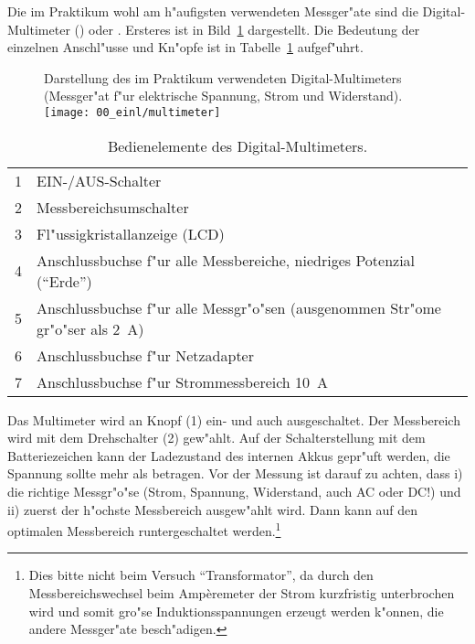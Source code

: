 Die im Praktikum wohl am h"aufigsten verwendeten Messger"ate sind
die Digital-Multimeter ()  oder
. Ersteres ist in
Bild~\ref{a:multimeter} dargestellt. Die Bedeutung der einzelnen
Anschl"usse und Kn"opfe ist in Tabelle~\ref{t:multimeter}
aufgef"uhrt.
%
{\samepage
\begin{figure}[t]
 \begin{captionbeside}{\label{a:multimeter}Darstellung des im Praktikum verwendeten
  Digital-Multimeters  (Messger"at f"ur elektrische Spannung,
  Strom und Widerstand).}
  \texttt{[image: 00\_einl/multimeter]}
 \end{captionbeside}
\end{figure}
%
\begin{table}[t]%
  \centering%
  \caption{\label{t:multimeter}Bedienelemente des Digital-Multimeters.}%
  \begin{tabular}{lp{10cm}}\toprule%
  1 & EIN-/AUS-Schalter  \\
  2 & Messbereichsumschalter  \\
  3 & Fl"ussigkristallanzeige (LCD)  \\
  4 & Anschlussbuchse f"ur alle Messbereiche, niedriges Potenzial ("`Erde"')\\
  5 & Anschlussbuchse f"ur alle Messgr"o"sen (ausgenommen Str"ome gr"o"ser als
  2~A)   \\
  6 & Anschlussbuchse f"ur Netzadapter   \\
  7 & Anschlussbuchse f"ur Strommessbereich 10~A  \\ \bottomrule
\end{tabular}
\end{table}
}
%
Das Multimeter wird an Knopf (1) ein- und auch ausgeschaltet. Der
Messbereich wird mit dem Drehschalter (2) gew"ahlt. Auf der
Schalterstellung mit dem Batteriezeichen kann der Ladezustand des
internen Akkus gepr"uft werden, die Spannung sollte mehr als
 betragen. Vor der Messung ist darauf zu achten,
dass i) die richtige Messgr"o"se (Strom, Spannung, Widerstand, auch
AC oder DC!) und ii) zuerst der h"ochste Messbereich ausgew"ahlt
wird. Dann kann auf den optimalen Messbereich runtergeschaltet
werden.\footnote{Dies bitte nicht beim Versuch "`Transformator"',
da durch den Messbereichswechsel beim Amp\`{e}remeter der Strom
kurzfristig unterbrochen wird und somit gro"se Induktionsspannungen
erzeugt werden k"onnen, die andere Messger"ate besch"adigen.}

